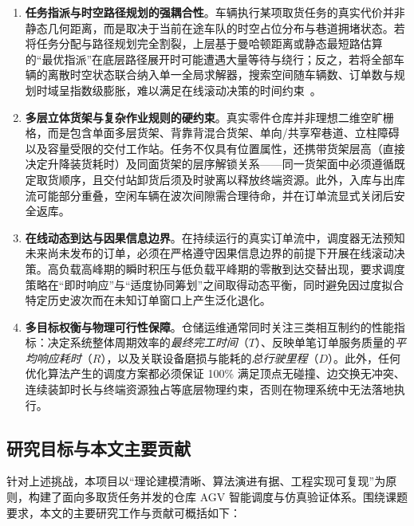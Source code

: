 \begin{enumerate}
  \item \textbf{任务指派与时空路径规划的强耦合性}。车辆执行某项取货任务的真实代价并非静态几何距离，而是取决于当前在途车队的时空占位分布与巷道拥堵状态。若将任务分配与路径规划完全割裂，上层基于曼哈顿距离或静态最短路估算的“最优指派”在底层路径展开时可能遭遇大量等待与绕行；反之，若将全部车辆的离散时空状态联合纳入单一全局求解器，搜索空间随车辆数、订单数与规划时域呈指数级膨胀，难以满足在线滚动决策的时间约束~\cite{li2021rhcr}。
  \item \textbf{多层立体货架与复杂作业规则的硬约束}。真实零件仓库并非理想二维空旷栅格，而是包含单面多层货架、背靠背混合货架、单向/共享窄巷道、立柱障碍以及容量受限的交付工作站。任务不仅具有位置属性，还携带货架层高（直接决定升降装货耗时）及同面货架的层序解锁关系——同一货架面中必须遵循既定取货顺序，且交付站卸货后须及时驶离以释放终端资源。此外，入库与出库流可能部分重叠，空闲车辆在波次间隙需合理待命，并在订单流显式关闭后安全返库。
  \item \textbf{在线动态到达与因果信息边界}。在持续运行的真实订单流中，调度器无法预知未来尚未发布的订单，必须在严格遵守因果信息边界的前提下开展在线滚动决策。高负载高峰期的瞬时积压与低负载平峰期的零散到达交替出现，要求调度策略在“即时响应”与“适度协同筹划”之间取得动态平衡，同时避免因过度拟合特定历史波次而在未知订单窗口上产生泛化退化。
  \item \textbf{多目标权衡与物理可行性保障}。仓储运维通常同时关注三类相互制约的性能指标：决定系统整体周期效率的\emph{最终完工时间}（$T$）、反映单笔订单服务质量的\emph{平均响应耗时}（$R$），以及关联设备磨损与能耗的\emph{总行驶里程}（$D$）。此外，任何优化算法产生的调度方案都必须保证 100\% 满足顶点无碰撞、边交换无冲突、连续装卸时长与终端资源独占等底层物理约束，否则在物理系统中无法落地执行。
\end{enumerate}

\subsection{研究目标与本文主要贡献}

针对上述挑战，本项目以“理论建模清晰、算法演进有据、工程实现可复现”为原则，构建了面向多取货任务并发的仓库 AGV 智能调度与仿真验证体系。围绕课题要求，本文的主要研究工作与贡献可概括如下：

